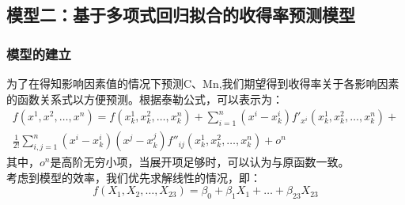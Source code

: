 \documentclass[12pt]{article}%
\begin{document}
\subsection{模型二：基于多项式回归拟合的收得率预测模型}
\subsubsection{模型的建立}
为了在得知影响因素值的情况下预测C、Mn,我们期望得到收得率关于各影响因素的函数关系式以方便预测。根据泰勒公式，可以表示为：
\begin{equation}\label{taile}
\begin{split}
f(x^1,x^2,\ldots,x^n)=f(x^1_k,x^2_k,\ldots,x^n_k)+\sum_{i=1}^n\left(x^i-x^i_k\right)f′_{x^i}\left(x^1_k,x^2_k,\ldots,x^n_k\right)+\\\frac{1}{2!} \sum_{i,j=1}^n \left(x^i-x^i_k \right)\left(x^j-x^j_k\right)f''_{ij} \left(x^1_k,x^2_k,\ldots,x^n_k\right)+o^n
\end{split}
\end{equation}
其中，$o^n$是高阶无穷小项，当展开项足够时，可以认为与原函数一致。\\
考虑到模型的效率，我们优先求解线性的情况，即：
\begin{equation}\label{xianxing}
  f(X_1,X_2,\ldots,X_{23})=\beta_0+\beta_1 X_1+\ldots+\beta_{23}X_{23}
\end{equation}
\end{document}
